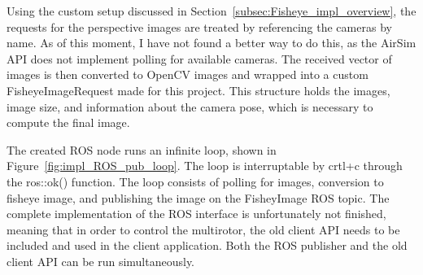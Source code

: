Using the custom setup discussed in Section~\ref{subsec:Fisheye_impl_overview}, the requests for the perspective images are treated by referencing the cameras by name. As of this moment, I have not found a better way to do this, as the AirSim API does not implement polling for available cameras. The received vector of images is then converted to OpenCV images and wrapped into a custom FisheyeImageRequest made for this project. This structure holds the images, image size, and information about the camera pose, which is necessary to compute the final image.

The created ROS node runs an infinite loop, shown in Figure~\ref{fig:impl_ROS_pub_loop}. The loop is interruptable by crtl+c through the ros::ok() function. The loop consists of polling for images, conversion to fisheye image, and publishing the image on the FisheyImage ROS topic. The complete implementation of the ROS interface is unfortunately not finished, meaning that in order to control the multirotor, the old client API needs to be included and used in the client application. Both the ROS publisher and the old client API can be run simultaneously.




\cleardoublepage